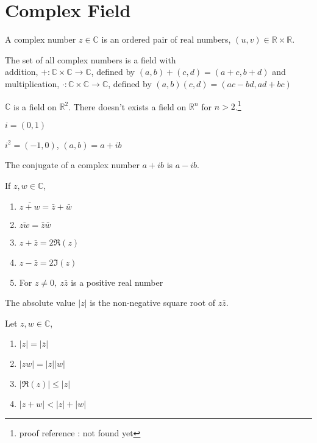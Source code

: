 \section{Complex Field}
	\begin{definition}
		A complex number $z \in \mathbb{C}$ is an ordered pair of real numbers, $(u,v) \in \mathbb{R} \times \mathbb{R}$.
	\end{definition}
	\begin{theorem}
		The set of all complex numbers is a field with\\
		addition, $+ : \mathbb{C} \times \mathbb{C} \to \mathbb{C}$, defined by $(a,b)+(c,d) = (a+c,b+d)$ and\\
		multiplication, $\cdot : \mathbb{C} \times \mathbb{C} \to \mathbb{C}$, defined by $(a,b)(c,d) = (ac-bd,ad+bc)$
	\end{theorem}
	\begin{remark}
		$\mathbb{C}$ is a field on $\mathbb{R}^2$.
		There doesn't exists a field on $\mathbb{R}^n$ for $n>2$.\footnote{proof reference : not found yet}
	\end{remark}
	\begin{definition}
		$i = (0,1)$
	\end{definition}
	\begin{theorem}
		$i^2 = (-1,0)$, $(a,b) = a + ib$
	\end{theorem}
	\begin{definition}
		The conjugate of a complex number $a+ib$ is $a-ib$.
	\end{definition}
	\begin{theorem} If $z,w \in \mathbb{C}$,
		\begin{enumerate}
			\item $\overline{z+w} = \bar{z} + \bar{w}$
			\item $\overline{zw} = \bar{z} \bar{w}$
			\item $z + \bar{z} = 2\Re{(z)}$
			\item $z - \bar{z} = 2\Im{(z)}$
			\item For $z \ne 0,\ z\bar{z}$ is a positive real number
		\end{enumerate}
	\end{theorem}
	\begin{definition}
		The absolute value $|z|$ is the non-negative square root of $z\bar{z}$.
	\end{definition}
	\begin{theorem} Let $z,w \in \mathbb{C}$,
		\begin{enumerate}
			\item $|z| = |\bar{z}|$
			\item $|zw| = |z||w|$
			\item $|\Re{(z)}| \le |z|$
			\item $|z+w| < |z| + |w|$
		\end{enumerate}
	\end{theorem}
